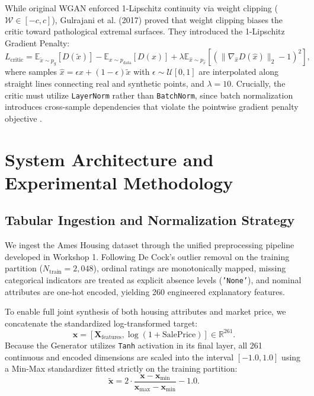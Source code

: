 \documentclass[11pt,letterpaper]{article}
\begin{document}
While original WGAN enforced 1-Lipschitz continuity via weight clipping ($\mathcal{W} \in [-c, c]$), Gulrajani et al. (2017) \cite{gulrajani2017} proved that weight clipping biases the critic toward pathological extremal surfaces. They introduced the 1-Lipschitz Gradient Penalty:
\begin{equation}
L_{\text{critic}} = \mathbb{E}_{\tilde{x} \sim p_g}[D(\tilde{x})] - \mathbb{E}_{x \sim p_{\text{data}}}[D(x)] + \lambda \mathbb{E}_{\hat{x} \sim p_{\hat{x}}}\left[\left(\|\nabla_{\hat{x}} D(\hat{x})\|_2 - 1\right)^2\right],
\end{equation}
where samples $\hat{x} = \epsilon x + (1 - \epsilon)\tilde{x}$ with $\epsilon \sim \mathcal{U}[0, 1]$ are interpolated along straight lines connecting real and synthetic points, and $\lambda = 10$. Crucially, the critic must utilize \texttt{LayerNorm} rather than \texttt{BatchNorm}, since batch normalization introduces cross-sample dependencies that violate the pointwise gradient penalty objective \cite{gulrajani2017}.

\section{System Architecture and Experimental Methodology}

\subsection{Tabular Ingestion and Normalization Strategy}
We ingest the Ames Housing dataset through the unified preprocessing pipeline developed in Workshop 1. Following De Cock's outlier removal on the training partition ($N_{\text{train}} = 2,048$), ordinal ratings are monotonically mapped, missing categorical indicators are treated as explicit absence levels (\texttt{'None'}), and nominal attributes are one-hot encoded, yielding 260 engineered explanatory features.

To enable full joint synthesis of both housing attributes and market price, we concatenate the standardized log-transformed target:
\begin{equation}
\mathbf{x} = \left[\mathbf{X}_{\text{features}}, \log(1 + \text{SalePrice})\right] \in \mathbb{R}^{261}.
\end{equation}
Because the Generator utilizes \texttt{Tanh} activation in its final layer, all 261 continuous and encoded dimensions are scaled into the interval $[-1.0, 1.0]$ using a Min-Max standardizer fitted strictly on the training partition:
\begin{equation}
\tilde{\mathbf{x}} = 2 \cdot \frac{\mathbf{x} - \mathbf{x}_{\min}}{\mathbf{x}_{\max} - \mathbf{x}_{\min}} - 1.0.
\end{equation}
\end{document}
